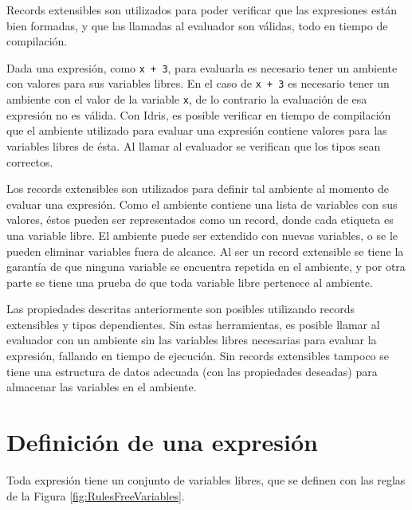 Records extensibles son utilizados para poder verificar que las expresiones están bien formadas, y que las llamadas al evaluador son válidas, todo en tiempo de compilación.

Dada una expresión, como \texttt{x + 3}, para evaluarla es necesario tener un ambiente con valores para sus variables libres. En el caso de \texttt{x + 3} es necesario tener un ambiente con el valor de la variable \texttt{x}, de lo contrario la evaluación de esa expresión no es válida. Con Idris, es posible verificar en tiempo de compilación que el ambiente utilizado para evaluar una expresión contiene valores para las variables libres de ésta. Al llamar al evaluador se verifican que los tipos sean correctos.

Los records extensibles son utilizados para definir tal ambiente al momento de evaluar una expresión. Como el ambiente contiene una lista de variables con sus valores, éstos pueden ser representados como un record, donde cada etiqueta es una variable libre. El ambiente puede ser extendido con nuevas variables, o se le pueden eliminar variables fuera de alcance. Al ser un record extensible se tiene la garantía de que ninguna variable se encuentra repetida en el ambiente, y por otra parte se tiene una prueba de que toda variable libre pertenece al ambiente.

Las propiedades descritas anteriormente son posibles utilizando records extensibles y tipos dependientes. Sin estas herramientas, es posible llamar al evaluador con un ambiente sin las variables libres necesarias para evaluar la expresión, fallando en tiempo de ejecución. Sin records extensibles tampoco se tiene una estructura de datos adecuada (con las propiedades deseadas) para almacenar las variables en el ambiente.

\section{Definición de una expresión}

Toda expresión tiene un conjunto de variables libres, que se definen con las reglas de la Figura \ref{fig:RulesFreeVariables}.


